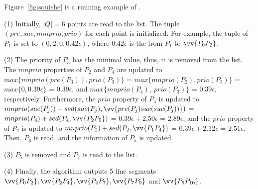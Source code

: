 \begin{example}
\label{exm-alg-squishe}
Figure~\ref{fig:squishe} is a running example of \squishe.

\ni (1) Initially, $|Q| = 6$ points are read to the list. The tuple $(pre, suc, mmprio, prio)$ for each point is initialized. For example, the tuple of $P_1$ is set to $(0, 2, 0, 0.42\epsilon)$, where $0.42\epsilon$ is the \sed from $P_1$ to $\vv{P_0P_2}$.

\ni (2) The priority of $P_3$ has the minimal value, thus, it is removed from the list.
The $mnprio$ properties of $P_2$ and $P_4$ are updated to $max\{mnprio(pre(P_3)), prio(P_3)\}$ = $max\{mnprio(P_2), prio(P_3)\}$ = $max\{0, 0.39\epsilon\}$ = $0.39\epsilon$, and $max\{mnprio(P_4), ~prio(P_3)\}$ = $0.39\epsilon$, respectively.
Furthermore, the $prio$ property of $P_4$ is updated to $mnprio(suc(P_j)) + sed(suc(P_j),\vv{pre(P_{j})suc(suc(P_{j}))})$ = $mnprio(P_4) + sed(P_4,\vv{P_2P_5})$ = $0.39\epsilon + 2.50\epsilon$ = $2.89\epsilon$, and the $prio$ property of $P_2$ is updated to $mnprio(P_2) + sed(P_2,\vv{P_1P_4})$ = $0.39\epsilon + 2.12\epsilon$ = $2.51\epsilon$.
Then, $P_6$ is read, and the information of $P_5$ is updated.

\ni (3) $P_5$ is removed and $P_7$ is read to the list.

\ni (4) Finally, the algorithm outputs 5 line segments $\vv{P_0P_2},\vv{P_2P_4},\vv{P_4P_7},\vv{P_7P_9}$ and $\vv{P_9P_{10}}$.
\end{example}






